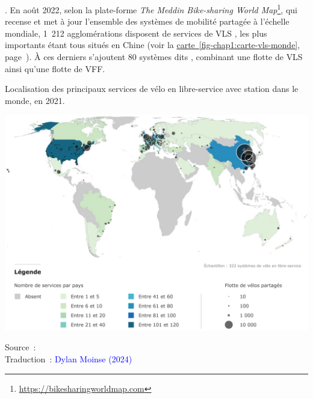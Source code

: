 \begin{refsegment}
{} \textcolor{blue}{\autocite[225]{dauncey_french_2012}}. En août 2022, selon la plate-forme \textsl{The Meddin Bike-sharing World Map}\footnote{
    \url{https://bikesharingworldmap.com}
}, qui recense et met à jour l’ensemble des systèmes de mobilité partagée à l’échelle mondiale, 1~212 agglomérations disposent de services de \acrshort{VLS} \textcolor{blue}{\autocite[7]{the_meddin_bike-sharing_world_map_meddin_2022}}, les plus importants étant tous situés en Chine (voir la \hyperref[fig-chap1:carte-vls-monde]{carte~\ref{fig-chap1:carte-vls-monde}}, page~\pageref{fig-chap1:carte-vls-monde}). À ces derniers s’ajoutent 80 systèmes dits , combinant une flotte de \acrshort{VLS} ainsi qu'une flotte de \acrfull{VFF}.%

    \begin{carte}[h!]\vspace*{4pt}
        \caption{Localisation des principaux services de vélo en libre-service avec station dans le monde, en 2021.}
        \label{fig-chap1:carte-vls-monde}
        \centerline{\includegraphics[width=1\columnwidth]{src/Figures/Chap-1/FR_Carte_VLS_monde.png}}
        \vspace{5pt}
        \begin{flushright}\scriptsize{
        Source~: \textcolor{blue}{\textcite[3]{todd_global_2021}}
        \\
        Traduction~: \textcolor{blue}{Dylan Moinse (2024)}
        }\end{flushright}
    \end{carte}


\end{refsegment}

